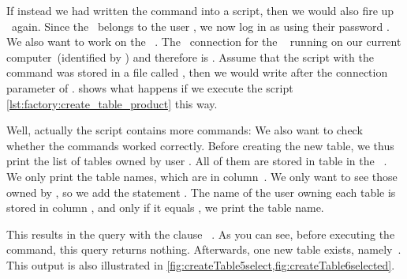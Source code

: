 %
%

If instead we had written the command into a script, then we would also fire up \psql\ again.
Since the \db\ belongs to the user , we now log in as  using their password .
We also want to work on the \db\ .
The \postgresql\ connection  for the \db\  running on our current computer~(identified by \localhost) and therefore is .
Assume that the script with the command was stored in a file called , then we would write  after the connection  parameter of \psql.
 shows what happens if we execute the script \cref{lst:factory:create_table_product} this way.

Well, actually the script contains more commands:
We also want to check whether the commands worked correctly.
Before creating the new table, we thus print the list of tables owned by user .
All of them are stored in table  in the \postgresql\ .
We only print the table names, which are in column~.
We only want to see those owned by , so we add the statement .
The name of the user owning each table is stored in column , and only if it equals , we print the table name.%
%
\begin{sloppypar}%
This results in the query  with the clause ~\cite{PGDG:PD:SC:S}.
As you can see, before executing the  command, this query returns nothing.
Afterwards, one new table exists, namely~.
This output is also illustrated in \cref{fig:createTable5select,fig:createTable6selected}.%
\end{sloppypar}%
%
\FloatBarrier%
\endhsection%
%
